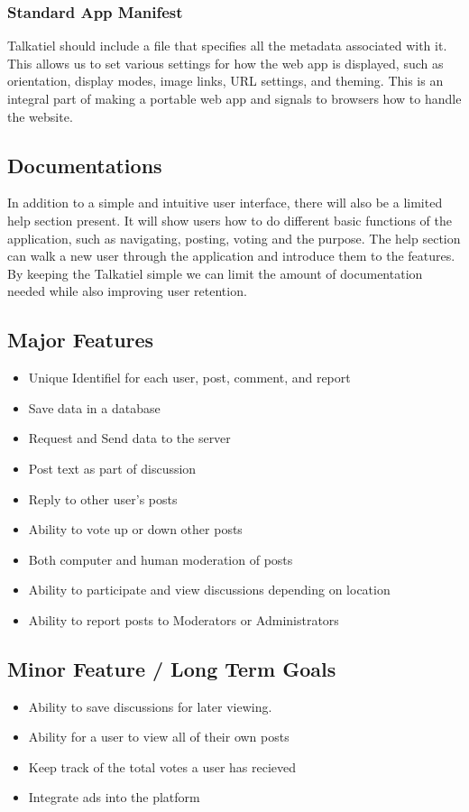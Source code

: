 \documentclass[12pt]{article}
\begin{document}
\subsubsection{Standard App Manifest}
Talkatiel should include a file that specifies all the metadata associated with it.
This allows us to set various settings for how the web app is displayed, such as orientation, display modes, image links, URL settings, and theming.  This is an integral part of making a portable web app and signals to browsers how to handle the website.
\subsection{Documentations}
In addition to a simple and intuitive user interface, there will also be a limited help section present.  It will show users how to do different basic functions of the application, such as navigating, posting, voting and the purpose.  The help section can walk a new user through the application and introduce them to the features.  By keeping the Talkatiel simple we can limit the amount of documentation needed while also improving user retention.
\subsection{Major Features}
\begin{itemize}
      \item Unique Identifiel for each user, post, comment, and report
      \item Save data in a database
      \item Request and Send data to the server
      \item Post text as part of discussion
      \item Reply to other user's posts
      \item Ability to vote up or down other posts
      \item Both computer and human moderation of posts
      \item Ability to participate and view discussions depending on location
      \item Ability to report posts to Moderators or Administrators
\end{itemize}
\subsection{Minor Feature / Long Term Goals}
\begin{itemize}
      \item Ability to save discussions for later viewing.
      \item Ability for a user to view all of their own posts
      \item Keep track of the total votes a user has recieved
      \item Integrate ads into the platform
\end{itemize}
\end{document}

